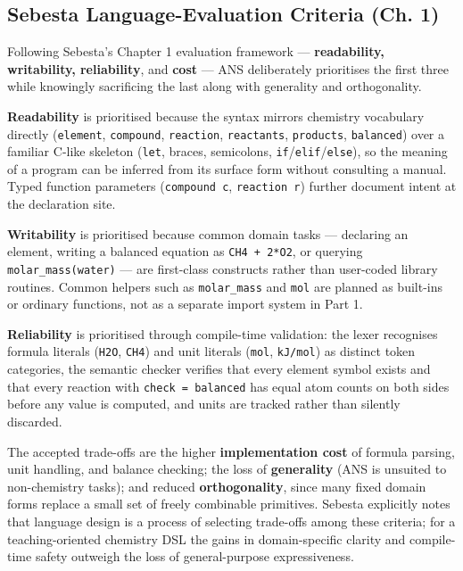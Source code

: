 \documentclass[11pt,a4paper]{article}
\newcommand{\code}[1]{\texttt{#1}}
\begin{document}
\subsection{Sebesta Language-Evaluation Criteria (Ch. 1)}

Following Sebesta's Chapter 1 evaluation framework --- \textbf{readability, writability, reliability}, and \textbf{cost} --- ANS deliberately prioritises the first three while knowingly sacrificing the last along with generality and orthogonality.

\textbf{Readability} is prioritised because the syntax mirrors chemistry vocabulary directly (\code{element}, \code{compound}, \code{reaction}, \code{reactants}, \code{products}, \code{balanced}) over a familiar C-like skeleton (\code{let}, braces, semicolons, \code{if}/\code{elif}/\code{else}), so the meaning of a program can be inferred from its surface form without consulting a manual. Typed function parameters (\code{compound c}, \code{reaction r}) further document intent at the declaration site.

\textbf{Writability} is prioritised because common domain tasks --- declaring an element, writing a balanced equation as \code{CH4 + 2*O2}, or querying \code{molar\_mass(water)} --- are first-class constructs rather than user-coded library routines. Common helpers such as \code{molar\_mass} and \code{mol} are planned as built-ins or ordinary functions, not as a separate import system in Part 1.

\textbf{Reliability} is prioritised through compile-time validation: the lexer recognises formula literals (\code{H2O}, \code{CH4}) and unit literals (\code{mol}, \code{kJ/mol}) as distinct token categories, the semantic checker verifies that every element symbol exists and that every reaction with \code{check = balanced} has equal atom counts on both sides before any value is computed, and units are tracked rather than silently discarded.

The accepted trade-offs are the higher \textbf{implementation cost} of formula parsing, unit handling, and balance checking; the loss of \textbf{generality} (ANS is unsuited to non-chemistry tasks); and reduced \textbf{orthogonality}, since many fixed domain forms replace a small set of freely combinable primitives. Sebesta explicitly notes that language design is a process of selecting trade-offs among these criteria; for a teaching-oriented chemistry DSL the gains in domain-specific clarity and compile-time safety outweigh the loss of general-purpose expressiveness.
\end{document}
